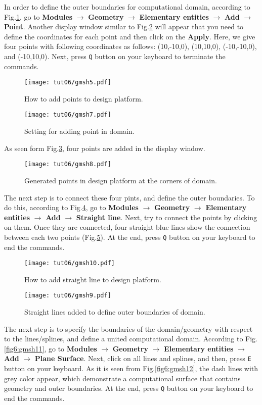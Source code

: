 In order to define the outer boundaries for computational domain, according to Fig.\ref{fig6:gmsh5}, go to \textbf{Modules} $\rightarrow$ \textbf{Geometry} $\rightarrow$ \textbf{Elementary entities} $\rightarrow$ \textbf{Add} $\rightarrow$ \textbf{Point}. Another display window similar to Fig.\ref{fig6:gmsh7} will appear that you need to define the coordinates for each point and then click on the \textbf{Apply}. Here, we give four points with following coordinates as follows: (10,-10,0), (10,10,0), (-10,-10,0), and (-10,10,0). Next, press \texttt{Q} button on your keyboard to terminate the commands.
\begin{figure}[htbp]
    \centering
    \texttt{[image: tut06/gmsh5.pdf]}
    \caption{How to add points to design platform.}
    \label{fig6:gmsh5}
\end{figure}
\begin{figure}[htbp]
    \centering
    \texttt{[image: tut06/gmsh7.pdf]}
    \caption{Setting for adding point in domain.}
    \label{fig6:gmsh7}
\end{figure}
As seen form Fig.\ref{fig6:gmsh8}, four points are added in the display window.
\begin{figure}[htbp]
    \centering
    \texttt{[image: tut06/gmsh8.pdf]}
    \caption{Generated points in design platform at the corners of domain.}
    \label{fig6:gmsh8}
\end{figure}
The next step is to connect these four pints, and define the outer boundaries. To do this, according to Fig.\ref{fig6:gmsh10}, go to \textbf{Modules} $\rightarrow$ \textbf{Geometry} $\rightarrow$ \textbf{Elementary entities} $\rightarrow$ \textbf{Add} $\rightarrow$ \textbf{Straight line}. Next, try to connect the points by clicking on them. Once they are connected, four straight blue lines show the connection between each two points (Fig.\ref{fig6:gmsh9}). At the end, press \texttt{Q} button on your keyboard to end the commands.
\begin{figure}[htbp]
    \centering
    \texttt{[image: tut06/gmsh10.pdf]}
    \caption{How to add straight line to design platform.}
    \label{fig6:gmsh10}
\end{figure}
\begin{figure}[htbp]
    \centering
    \texttt{[image: tut06/gmsh9.pdf]}
    \caption{Straight lines added to define outer boundaries of domain.}
    \label{fig6:gmsh9}
\end{figure}
The next step is to specify the boundaries of the domain/geometry with respect to the lines/splines, and define a united computational domain. According to Fig. \ref{fig6:gmsh11}, go to \textbf{Modules} $\rightarrow$ \textbf{Geometry} $\rightarrow$ \textbf{Elementary entities} $\rightarrow$ \textbf{Add} $\rightarrow$ \textbf{Plane Surface}. Next, click on all lines and splines, and then, press \texttt{E} button on your keyboard. As it is seen from Fig.\ref{fig6:gmsh12}, the dash lines with grey color appear, which demonstrate a computational surface that contains geometry and outer boundaries. At the end, press \texttt{Q} button on your keyboard to end the commands.
